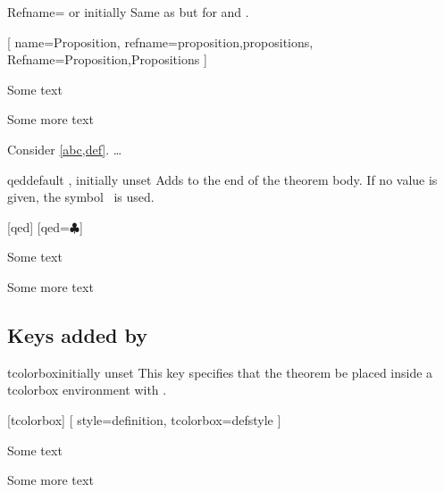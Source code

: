 \documentclass{ltxdoc}
\begin{document}
\begin{docKey}{Refname}{= \textrm{or} }{initially }
Same as  but for  and .
\begin{tcbwritetemp}
[
  name=Proposition,
  refname={proposition,propositions},
  Refname={Proposition,Propositions}
  ]
\end{tcbwritetemp}
\begin{keythmscode}[withpreamble]
\begin{prop}[label=abc]
Some text
\end{prop}
\begin{prop}[label=def]
Some more text
\end{prop}
\begin{theorem}
Consider \cref{abc,def}.
 \dots
\end{theorem}
\end{keythmscode}
\end{docKey}

\begin{docKey}{qed}{}{default , initially unset}
Adds  to the end of the theorem body. If no value is given, the symbol \openbox\ is used.
\begin{tcbwritetemp}
[qed]
[qed=$\clubsuit$]
\end{tcbwritetemp}
\begin{keythmscode}[withpreamble]
\begin{example}
Some text
\end{example}
\begin{solution}
Some more text
\end{solution}
\end{keythmscode}
\end{docKey}

\subsection{Keys added by } \label{thm-added-keys}

\begin{docKey}{tcolorbox}{}{initially unset}
This key specifies that the theorem be placed inside a tcolorbox environment with .
\begin{tcbwritetemp}
[tcolorbox]
[
  style=definition,
  tcolorbox={defstyle}
  ]
\end{tcbwritetemp}
\begin{keythmscode}[withpreamble]
\begin{corollary}
Some text
\end{corollary}
\begin{definition}
Some more text
\end{definition}
\end{keythmscode}
\end{docKey}
\end{document}
